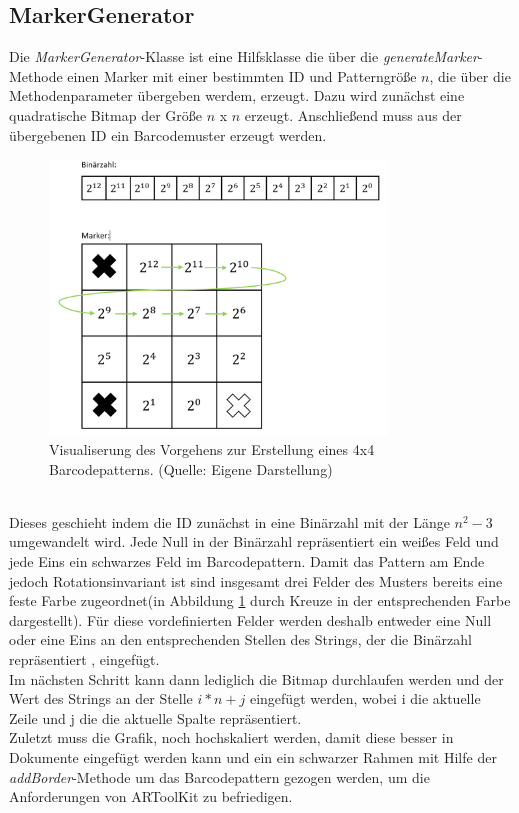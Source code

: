 \subsection{MarkerGenerator}
Die \textit{MarkerGenerator}-Klasse ist eine Hilfsklasse die über die \textit{generateMarker}-Methode einen Marker mit einer bestimmten ID und Patterngröße $n$, die über die Methodenparameter übergeben werdem, erzeugt. Dazu wird zunächst eine quadratische Bitmap der Größe $n$ x $n$ erzeugt. Anschließend muss aus der übergebenen ID ein Barcodemuster erzeugt werden.
\begin{figure}[h!]
\centering
\includegraphics[width=0.8\textwidth]{Abbildungen/barcode-creation.png}
\caption[Markererstellung]{Visualiserung des Vorgehens zur Erstellung eines 4x4 Barcodepatterns. (Quelle: Eigene Darstellung)}
\label{fig:barcode-creation}
\end{figure}\\ 
Dieses geschieht indem die ID zunächst in eine Binärzahl mit der Länge $n^2 - 3$ umgewandelt wird. Jede Null in der Binärzahl repräsentiert ein weißes Feld und jede Eins ein schwarzes Feld im Barcodepattern. Damit das Pattern am Ende jedoch Rotationsinvariant ist sind insgesamt drei Felder des Musters bereits eine feste Farbe zugeordnet(in Abbildung \ref{fig:barcode-creation} durch Kreuze in der entsprechenden Farbe dargestellt). Für diese vordefinierten Felder werden deshalb entweder eine Null oder eine Eins an den entsprechenden Stellen des Strings, der die Binärzahl repräsentiert , eingefügt.\\
Im nächsten Schritt kann dann lediglich die Bitmap durchlaufen werden und der Wert des Strings an der Stelle $i*n + j$ eingefügt werden, wobei i die aktuelle Zeile und j die die aktuelle Spalte repräsentiert. \\ 
Zuletzt muss die Grafik, noch hochskaliert werden, damit diese besser in Dokumente eingefügt werden kann und ein
ein schwarzer Rahmen mit Hilfe der \textit{addBorder}-Methode um das Barcodepattern gezogen werden, um die Anforderungen von ARToolKit zu befriedigen.
